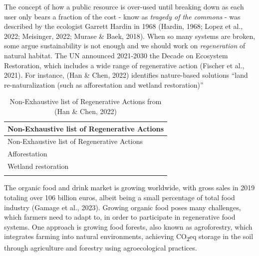 \documentclass[
  12pt,
  letterpaper,
  DIV=11,
  numbers=noendperiod]{scrartcl}
\begin{document}
The concept of how a public resource is over-used until breaking down as
each user only bears a fraction of the cost - know as \emph{tragedy of
the commons} - was described by the ecologist Garrett Hardin in 1968
(Hardin, 1968; Lopez et al., 2022; Meisinger, 2022; Murase \& Baek,
2018). When so many systems are broken, some argue sustainability is not
enough and we should work on \emph{regeneration} of natural habitat. The
UN announced 2021-2030 the Decade on Ecosystem Restoration, which
includes a wide range of regenerative action (Fischer et al., 2021). For
instance, (Han \& Chen, 2022) identifies nature-based solutions ``land
re-naturalization (such as afforestation and wetland restoration)''

\def\pandoctableshortcapt{Regenerative Actions}

\begin{longtable}[]{@{}l@{}}
\caption[Regenerative Actions]{Non-Exhaustive list of Regenerative
Actions from (Han \& Chen, 2022)}\tabularnewline
\toprule\noalign{}
Non-Exhaustive list of Regenerative Actions \\
\midrule\noalign{}
\endfirsthead
\toprule\noalign{}
Non-Exhaustive list of Regenerative Actions \\
\midrule\noalign{}
\endhead
\bottomrule\noalign{}
\endlastfoot
Afforestation \\
Wetland restoration \\
 \\
\end{longtable}

\let\pandoctableshortcapt\relax

The organic food and drink market is growing worldwide, with gross sales
in 2019 totaling over 106 billion euros, albeit being a small percentage
of total food industry (Gamage et al., 2023). Growing organic food poses
many challenges, which farmers need to adapt to, in order to participate
in regenerative food systems. One approach is growing food forests, also
known as agroforestry, which integrates farming into natural
environments, achieving CO\textsubscript{2}eq storage in the soil
through agriculture and forestry using agroecological practices.
\end{document}
